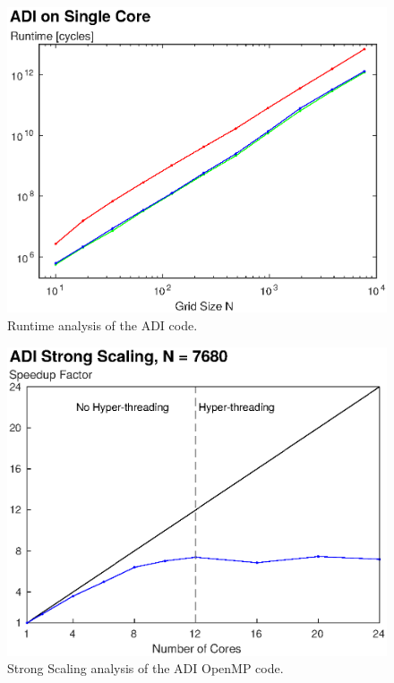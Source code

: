 \documentclass[letterpaper]{article}
\begin{document}
\begin{figure}\centering
  \includegraphics[width=\linewidth]{./plots/runtime_ADI_cropped.eps}
  \caption{Runtime analysis of the ADI code.}
  \label{fig:runtime_ADI}
\end{figure}

\begin{figure}\centering
  \includegraphics[width=\linewidth]{./plots/scaling_strong_ADI_cropped.eps}
  \caption{Strong Scaling analysis of the ADI OpenMP code.}
  \label{fig:scaling_strong_ADI}
\end{figure}
\end{document}
